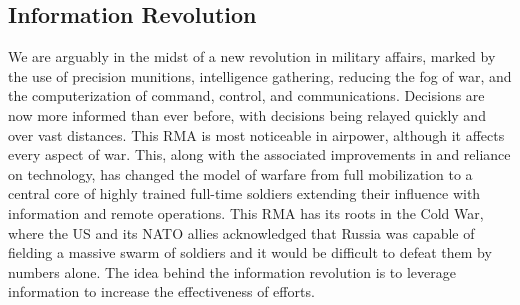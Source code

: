 \documentclass[nobib]{tufte-handout}
\begin{document}
\subsection{Information Revolution}
We are arguably in the midst of a new revolution 
in military affairs, marked by the use of precision munitions, 
intelligence gathering, reducing the fog of war, 
and the computerization of command, control, and 
communications. Decisions are now more informed 
than ever before, with decisions being relayed quickly and 
over vast distances. This RMA is most noticeable in 
airpower, although it affects every aspect of war. 
This, along with the associated improvements 
in and reliance on technology, has changed the 
model of warfare from full mobilization to a central 
core of highly trained full-time soldiers extending 
their influence with information and remote operations. 
This RMA has its roots in the Cold War, where the US 
and its NATO allies acknowledged that Russia was 
capable of fielding a massive swarm of soldiers 
and it would be difficult to defeat them by numbers alone. 
The idea behind the information revolution is 
to leverage information to increase the effectiveness 
of efforts. 
\end{document}
